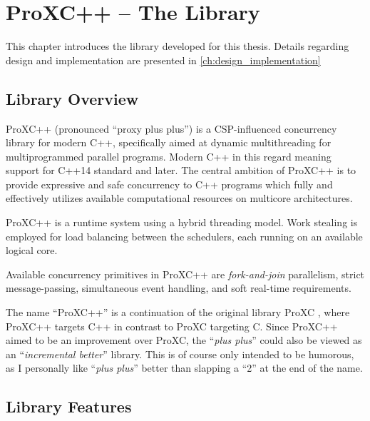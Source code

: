 
\chapter{ProXC++ -- The Library}
\label{ch:proxc_library}

This chapter introduces the library developed for this thesis. Details regarding design and implementation are presented in \cref{ch:design_implementation}


\section{Library Overview}

ProXC++ (pronounced ``proxy plus plus'') is a CSP\hyp{}influenced concurrency library for modern C++, specifically aimed at dynamic multithreading for multiprogrammed parallel programs. Modern C++ in this regard meaning support for C++14 standard and later. The central ambition of ProXC++ is to provide expressive and safe concurrency to C++ programs which fully and effectively utilizes available computational resources on multicore architectures.

ProXC++ is a runtime system using a hybrid threading model. Work stealing is employed for load balancing between the schedulers, each running on an available logical core. 

Available concurrency primitives in ProXC++ are \textit{fork\hyp{}and\hyp{}join} parallelism, strict message\hyp{}passing, simultaneous event handling, and soft real\hyp{}time requirements.

The name ``ProXC++'' is a continuation of the original library ProXC \citep{pettersen2016proxc}, where ProXC++ targets C++ in contrast to ProXC targeting C. Since ProXC++ aimed to be an improvement over ProXC, the ``\textit{plus plus}'' could also be viewed as an ``\textit{incremental better}'' library. This is of course only intended to be humorous, as I personally like ``\textit{plus plus}'' better than slapping a ``2'' at the end of the name.


\section{Library Features}

